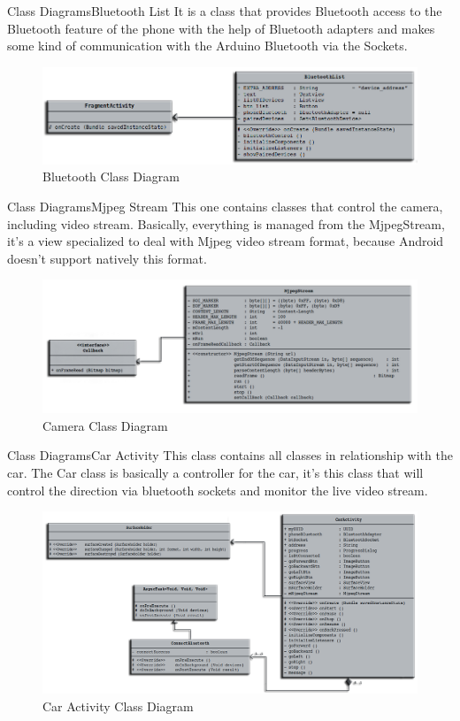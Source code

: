 \documentclass[xcolor=table, 9pt]{beamer}
\begin{document}
\begin{frame}{Class Diagrams}{Bluetooth List}
It is a class that provides Bluetooth access to the Bluetooth feature of the phone with the help of Bluetooth adapters and makes some kind of communication with the Arduino Bluetooth via the Sockets.
\begin{figure}
\includegraphics[width=1\linewidth]{Bluetooth_class_diagram2.png}
\caption{Bluetooth Class Diagram}
\end{figure}
\end{frame}


\begin{frame}{Class Diagrams}{Mjpeg Stream}
This one contains classes that control the camera, including video stream. Basically, everything is managed from the MjpegStream, it’s a view specialized to deal with Mjpeg video stream format, because Android doesn’t support natively this format.
\begin{figure}
\includegraphics[width=1\linewidth]{Camera_class_diagram2.png}
\caption{Camera Class Diagram}
\end{figure}
\end{frame}


\begin{frame}{Class Diagrams}{Car Activity}
This class contains all classes in relationship with the car. The Car class is basically a controller for the car, it’s this class that will control the direction via bluetooth sockets and monitor the live video stream.
\begin{figure}
\includegraphics[width=1\linewidth]{Car_class_diagram2.png}
\caption{Car Activity Class Diagram}
\end{figure}
\end{frame}
\end{document}
